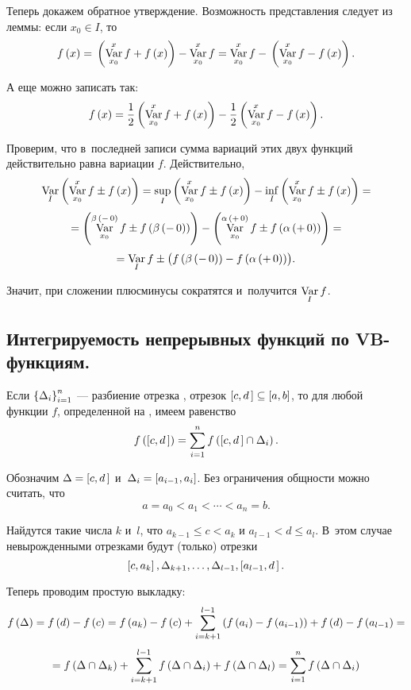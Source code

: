 \documentclass[draft]{article}
\begin{document}
Теперь докажем обратное утверждение. Возможность представления
следует из леммы: если $x_0\in I$, то
$$f\atx=\,\at(\var_{x_0}^xf+f\atx)-\var_{x_0}^xf=
\var_{x_0}^xf-\,\at(\var_{x_0}^xf-f\atx).$$

А еще можно записать так:
$$f\atx={1\over2}\at(\var_{x_0}^xf+f\atx)-{1\over2}\at(\var_{x_0}^xf-f\atx).$$

Проверим, что в~последней записи сумма вариаций этих двух функций
действительно равна вариации $f$. Действительно,
$$\var_I\at(\var_{x_0}^xf\pm f\atx)=\sup_I\at(\var_{x_0}^xf\pm f\atx)-
\inf_I\at(\var_{x_0}^xf\pm f\atx)=$$
$$=\at({\var_{x_0}^{\beta\,(-\,0)}f\pm f\at({\beta\,(-\,0)})})-
\at({\var_{x_0}^{\alpha\,(+\,0)}f\pm f\at({\alpha\,(+\,0)})})=$$
$$=\var_If\pm\bigl(f\at({\beta\,(-\,0)})-f\at({\alpha\,(+\,0)})\bigr).$$

Значит, при сложении плюсминусы сократятся и~получится $\mathop{\mathrm{Var}}\limits_If$.

\prut


\eject


\subsection{Интегрируемость непрерывных функций по VB-функциям.}

\lm

Если $\left\{\Delta_i\right\}_{i=1}^n$ --- разбиение отрезка \ab, отрезок
$\seg[c,d\,]\subseteq\seg[a,b]$, то для любой функции $f$,
определенной на \ab, имеем равенство
$$f\at(\seg[c,d\,])=\sum_{i=1}^nf\at(\seg[c,d\,]\cap\dei).$$

\pr

Обозначим $\Delta=\seg[c,d\,]$ и~$\dei=\seg[a_{i-1},a_i]$. Без
ограничения общности можно считать, что $$a=a_0<a_1<\cdots<a_n=b.$$

Найдутся такие числа $k$ и~$l$, что $a_{k-1}\le c<a_k$ и
$a_{l-1}<d\le a_l$. В~этом случае невырожденными отрезками будут
(только) отрезки
$$\seg[c,a_k],\Delta_{k+1},\dots,\Delta_{l-1},\seg[a_{l-1},d\,].$$

Теперь проводим простую выкладку:
$$f\at(\Delta)=f\at(d)-f\at(c)=f\at(a_k)-f\at(c)+
\sum_{i=k+1}^{l-1}\at({f\at(a_i)-f\at(a_{i-1})})+f\at(d)-f\at(a_{l-1})=$$
$$=f\at(\Delta\cap\Delta_k)+  \sum_{i=k+1}^{l-1}
f\at(\Delta\cap\dei)+f\at(\Delta\cap\Delta_l)=\sum_{i=1}^nf\at(\Delta\cap\dei)$$
\end{document}
